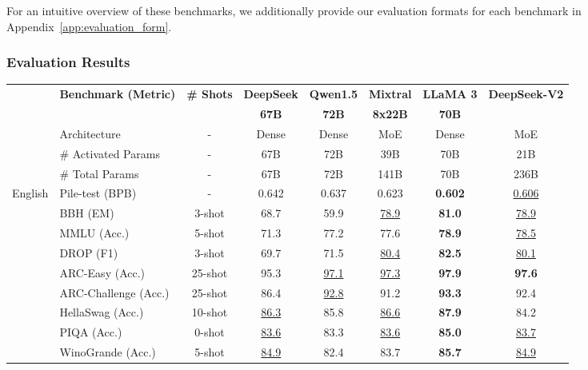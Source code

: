 \documentclass[11pt, a4paper, logo, copyright, nonumbering]{deepseek}
\newcommand{\dsvii}{DeepSeek-V2}
\begin{document}
\begin{CJK*}{UTF8}{gbsn}
For an intuitive overview of these benchmarks, we additionally provide our evaluation formats for each benchmark in Appendix~\ref{app:evaluation_form}. 

\subsubsection{Evaluation Results}

\begin{table}[!t]
    \centering
    \footnotesize
    \setlength{\tabcolsep}{5pt}
    \begin{tabular}{@{}c l c | c | c c c | c@{}}
    \toprule
    & \multirow{2}{*}{\centering \textbf{Benchmark (Metric)}} & \multirow{2}{*}{\textbf{\# Shots}} & \textbf{DeepSeek} & \textbf{Qwen1.5} & \textbf{Mixtral} & \textbf{LLaMA 3} & \multirow{2}{*}{\textbf{\dsvii{}}} \\
    & & & \textbf{67B} & \textbf{72B} & \textbf{8x22B} & \textbf{70B} & \\
    \midrule
    & Architecture & - & Dense & Dense & MoE & Dense & MoE \\
    & \# Activated Params & - & 67B & 72B & 39B & 70B & 21B \\
    & \# Total Params & - & 67B & 72B & 141B & 70B & 236B \\
    \midrule
    \multirow{16}{*}{English} & Pile-test (BPB) & - & 0.642 & 0.637 & 0.623 & \textbf{0.602} & \underline{0.606} \\
    & BBH (EM) & 3-shot & 68.7 & 59.9 & \underline{78.9} & \textbf{81.0} & \underline{78.9} \\
    & MMLU (Acc.) & 5-shot & 71.3 & 77.2 & 77.6 & \textbf{78.9} & \underline{78.5} \\
    & DROP (F1) & 3-shot & 69.7 & 71.5 & \underline{80.4} & \textbf{82.5} & \underline{80.1} \\
    & ARC-Easy (Acc.) & 25-shot & 95.3 & \underline{97.1} & \underline{97.3} & \textbf{97.9} & \textbf{97.6} \\
    & ARC-Challenge (Acc.) & 25-shot & 86.4 & \underline{92.8} & 91.2 & \textbf{93.3} & 92.4 \\
    & HellaSwag (Acc.) & 10-shot & \underline{86.3} & 85.8 & \underline{86.6} & \textbf{87.9} & 84.2 \\
    & PIQA (Acc.) & 0-shot & \underline{83.6} & 83.3 & \underline{83.6} & \textbf{85.0} & \underline{83.7} \\
    & WinoGrande (Acc.) & 5-shot & \underline{84.9} & 82.4 & 83.7 & \textbf{85.7} & \underline{84.9} \\

\end{tabular}
\end{table}
\end{CJK*}
\end{document}
